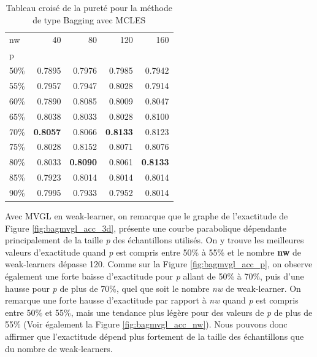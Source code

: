	\begin{table}[h!]
  		 \caption{Tableau croisé de la pureté pour la méthode de type Bagging avec MCLES}
  		 \centering
    	\begin{tabular}{lrrrr}
    	\toprule
    	nw & 40 & 80 & 120 & 160 \\
    	p &  &  &  &  \\
    	\midrule
    	50\% & 0.7895 & 0.7976 & 0.7985 & 0.7942 \\
    	55\% & 0.7957 & 0.7947 & 0.8028 & 0.7914 \\
    	60\% & 0.7890 & 0.8085 & 0.8009 & 0.8047 \\
    	65\% & 0.8038 & 0.8033 & 0.8028 & 0.8100 \\
    	70\% & \textbf{0.8057} & 0.8066 & \textbf{0.8133} & 0.8123 \\
    	75\% & 0.8028 & 0.8152 & 0.8071 & 0.8076 \\
    	80\% & 0.8033 & \textbf{0.8090} & 0.8061 & \textbf{0.8133} \\
    	85\% & 0.7923 & 0.8014 & 0.8014 & 0.8014 \\
    	90\% & 0.7995 & 0.7933 & 0.7952 & 0.8014 \\
    	\bottomrule
    	\end{tabular}
  		 \label{table:pur_mcles}
	\end{table}


    Avec MVGL en weak-learner, on remarque que le graphe de l'exactitude de Figure \ref{fig:bagmvgl_acc_3d}, présente une courbe parabolique dépendante principalement de la taille \textit{p} des échantillons utilisés.
    On y trouve les meilleures valeurs d'exactitude quand \textit{p} est compris entre 50\% à 55\% et le nombre \textbf{nw} de weak-learners dépasse 120.
    Comme sur la Figure \ref{fig:bagmvgl_acc_p}, on observe également une forte baisse d'exactitude pour \textit{p} allant de 50\% à 70\%, puis d'une hausse pour \textit{p} de plus de 70\%, quel que soit le nombre \textit{nw} de weak-learner.
    On remarque une forte hausse d'exactitude par rapport à \textit{nw} quand  \textit{p} est compris entre 50\% et 55\%, mais une tendance plus légère pour des valeurs de  \textit{p} de plus de 55\% (Voir également la Figure \ref{fig:bagmvgl_acc_nw}).
    Nous pouvons donc affirmer que l'exactitude dépend plus fortement de la taille des échantillons que du nombre de weak-learners.


